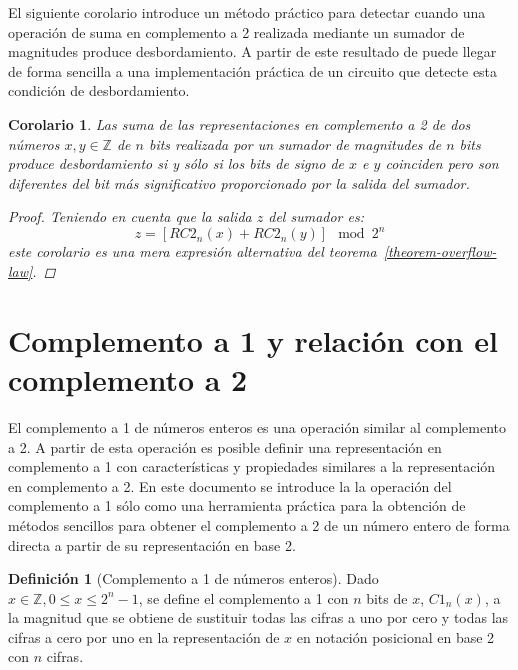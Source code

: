 \documentclass[spanish,a4paper,12pt,titlepage]{article}
\newtheorem{corollary}[theorem]{Corolario}
\theoremstyle{definition}
\newtheorem{definition}{Definición}%
\theoremstyle{remark}
\newcommand{\bbZ}{\mathbb{Z}}
\begin{document}
El siguiente corolario introduce un método práctico para detectar cuando una operación de suma en complemento a 2 realizada mediante un sumador de magnitudes produce desbordamiento. A partir de este resultado de puede llegar de forma sencilla a una implementación práctica de un circuito que detecte esta condición de desbordamiento.

\begin{corollary}
  Las suma de las representaciones en complemento a 2 de dos números $x, y \in \bbZ$ de $n$ bits realizada por un sumador de magnitudes de $n$ bits produce desbordamiento si y sólo si los bits de signo de $x$ e $y$ coinciden pero son diferentes del bit más significativo proporcionado por la salida del sumador.
  \begin{proof}
    Teniendo en cuenta que la salida $z$ del sumador es:
    \[
      z = [RC2_n(x)+RC2_n(y)] \mod 2^n
    \]
    este corolario es una mera expresión alternativa del teorema~\ref{theorem-overflow-law}.
  \end{proof}
\end{corollary}


\section{Complemento a 1 y relación con el complemento a 2}

El complemento a 1 de números enteros es una operación similar al complemento a 2. A partir de esta operación es posible definir una representación en complemento a 1 con características y propiedades similares a la representación en complemento a 2. En este documento se introduce la la operación del complemento a 1 sólo como una herramienta práctica para la obtención de métodos sencillos para obtener el complemento a 2 de un número entero de forma directa a partir de su representación en base 2.

\begin{definition}[Complemento a 1 de números enteros]\label{def-c1}
  Dado $x \in \bbZ, 0 \le x \le 2^n-1$, se define el complemento a 1 con $n$ bits de $x$, $C1_n(x)$, a la magnitud que se obtiene de sustituir todas las cifras a uno por cero y todas las cifras a cero por uno en la representación de $x$ en notación posicional en base 2 con $n$ cifras.
\end{definition}
\end{document}
